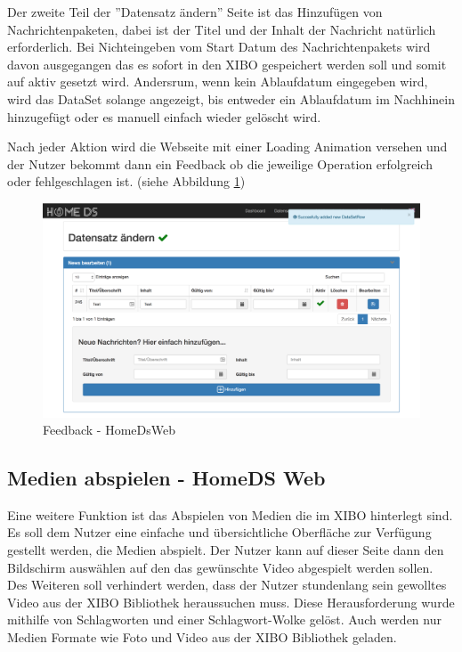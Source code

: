 Der zweite Teil der ''Datensatz ändern'' Seite ist das Hinzufügen von Nachrichtenpaketen, dabei ist der Titel und der Inhalt der Nachricht natürlich erforderlich. Bei Nichteingeben vom Start Datum des Nachrichtenpakets wird davon ausgegangen das es sofort in den XIBO gespeichert werden soll und somit auf aktiv gesetzt wird. Andersrum, wenn kein Ablaufdatum eingegeben wird, wird das DataSet solange angezeigt, bis entweder ein Ablaufdatum im Nachhinein hinzugefügt oder es manuell einfach wieder gelöscht wird.

Nach jeder Aktion wird die Webseite mit einer Loading Animation versehen und der Nutzer bekommt dann ein Feedback ob die jeweilige Operation erfolgreich oder fehlgeschlagen ist. (siehe Abbildung \ref{img:feedback})

\begin{figure}[H]
\centering
\includegraphics[width=1\textwidth]{images/08_HomeDsWeb/Message.png}
\caption{Feedback - HomeDsWeb}
\label{img:feedback}
\end{figure}

\subsection{Medien abspielen - HomeDS Web}\label{sec:playmedia}
Eine weitere Funktion ist das Abspielen von Medien die im XIBO hinterlegt sind. Es soll dem Nutzer eine einfache und übersichtliche Oberfläche zur Verfügung gestellt werden, die Medien abspielt. Der Nutzer kann auf dieser Seite dann den Bildschirm auswählen auf den das gewünschte Video abgespielt werden sollen. Des Weiteren soll verhindert werden, dass der Nutzer stundenlang sein gewolltes Video aus der XIBO Bibliothek heraussuchen muss. Diese Herausforderung wurde mithilfe von Schlagworten und einer Schlagwort-Wolke gelöst. Auch werden nur Medien Formate wie Foto und Video aus der XIBO Bibliothek geladen.

